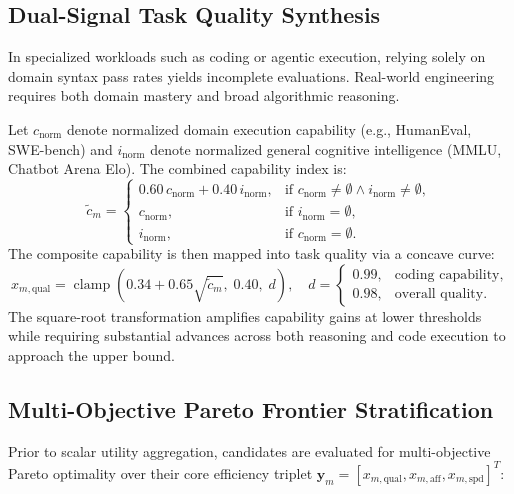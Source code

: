 \documentclass[pdflatex,sn-mathphys-num]{sn-jnl}
\theoremstyle{thmstyleone}
\theoremstyle{thmstylethree}
\begin{document}
\subsection{Dual-Signal Task Quality Synthesis}\label{subsec:quality}

In specialized workloads such as coding or agentic execution, relying solely on domain syntax pass rates yields incomplete evaluations. Real-world engineering requires both domain mastery and broad algorithmic reasoning.

Let $c_{\text{norm}}$ denote normalized domain execution capability (e.g., HumanEval, SWE-bench) and $i_{\text{norm}}$ denote normalized general cognitive intelligence (MMLU, Chatbot Arena Elo). The combined capability index is:
\begin{equation}\label{eq:dual_signal}
\tilde{c}_m = \begin{cases}
0.60 \, c_{\text{norm}} + 0.40 \, i_{\text{norm}}, & \text{if } c_{\text{norm}} \neq \emptyset \land i_{\text{norm}} \neq \emptyset, \\
c_{\text{norm}}, & \text{if } i_{\text{norm}} = \emptyset, \\
i_{\text{norm}}, & \text{if } c_{\text{norm}} = \emptyset.
\end{cases}
\end{equation}
The composite capability is then mapped into task quality via a concave curve:
\begin{equation}\label{eq:quality_curve}
x_{m, \text{qual}} = \operatorname{clamp}\left( 0.34 + 0.65 \sqrt{\tilde{c}_m}, \; 0.40, \; d \right), \quad d = \begin{cases} 0.99, & \text{coding capability}, \\ 0.98, & \text{overall quality}. \end{cases}
\end{equation}
The square-root transformation amplifies capability gains at lower thresholds while requiring substantial advances across both reasoning and code execution to approach the upper bound.

\subsection{Multi-Objective Pareto Frontier Stratification}\label{subsec:pareto}

Prior to scalar utility aggregation, candidates are evaluated for multi-objective Pareto optimality over their core efficiency triplet $\mathbf{y}_m = [x_{m, \text{qual}}, x_{m, \text{aff}}, x_{m, \text{spd}}]^T$:
\end{document}
